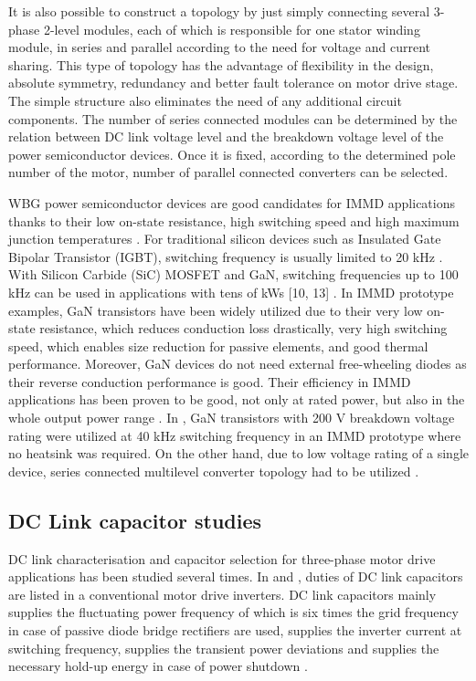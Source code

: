 \documentclass[conference,a4paper,twocolumn]{IEEEtran}
\begin{document}
It is also possible to construct a topology by just simply connecting several 3-phase 2-level modules, each of which is responsible for one stator winding module, in series and parallel according to the need for voltage and current sharing. This type of topology has the advantage of flexibility in the design, absolute symmetry, redundancy and better fault tolerance on motor drive stage. The simple structure also eliminates the need of any additional circuit components. The number of series connected modules can be determined by the relation between DC link voltage level and the breakdown voltage level of the power semiconductor devices. Once it is fixed, according to the determined pole number of the motor, number of parallel connected converters can be selected.

WBG power semiconductor devices are good candidates for IMMD applications thanks to their low on-state resistance, high switching speed and high maximum junction temperatures \cite{Morita2011}. For traditional silicon devices such as Insulated Gate Bipolar Transistor (IGBT), switching frequency is usually limited to 20 kHz \cite{Lambert2015a}. With Silicon Carbide (SiC) MOSFET and GaN, switching frequencies up to 100 kHz can be used in applications with tens of kWs [10, 13] \cite{Wang2015,Morita2011}. In IMMD prototype examples, GaN transistors have been widely utilized due to their very low on-state resistance, which reduces conduction loss drastically, very high switching speed, which enables size reduction for passive elements, and good thermal performance. Moreover, GaN devices do not need external free-wheeling diodes as their reverse conduction performance is good. Their efficiency in IMMD applications has been proven to be good, not only at rated power, but also in the whole output power range \cite{Morita2011}. In \cite{Wang2015}, GaN transistors with 200 V breakdown voltage rating were utilized at 40 kHz switching frequency in an IMMD prototype where no heatsink was required. On the other hand, due to low voltage rating of a single device, series connected multilevel converter topology had to be utilized \cite{Wang2013}.

\subsection{DC Link capacitor studies}

DC link characterisation and capacitor selection for three-phase motor drive applications has been studied several times. In \cite{Bianchi2003} and \cite{Lee2007}, duties of DC link capacitors are listed in a conventional motor drive inverters. DC link capacitors mainly supplies the fluctuating power frequency of which is six times the grid frequency in case of passive diode bridge rectifiers are used, supplies the inverter current at switching frequency, supplies the transient power deviations and supplies the necessary hold-up energy in case of power shutdown \cite{Bianchi2003}.
\end{document}
